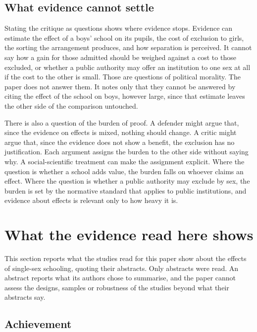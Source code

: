 \documentclass[11pt]{article}
\begin{document}
\subsection{What evidence cannot settle}

Stating the critique as questions shows where evidence stops. Evidence can estimate the effect of a boys' school on its pupils, the cost of exclusion to girls, the sorting the arrangement produces, and how separation is perceived. It cannot say how a gain for those admitted should be weighed against a cost to those excluded, or whether a public authority may offer an institution to one sex at all if the cost to the other is small. Those are questions of political morality. The paper does not answer them. It notes only that they cannot be answered by citing the effect of the school on boys, however large, since that estimate leaves the other side of the comparison untouched.

There is also a question of the burden of proof. A defender might argue that, since the evidence on effects is mixed, nothing should change. A critic might argue that, since the evidence does not show a benefit, the exclusion has no justification. Each argument assigns the burden to the other side without saying why. A social-scientific treatment can make the assignment explicit. Where the question is whether a school adds value, the burden falls on whoever claims an effect. Where the question is whether a public authority may exclude by sex, the burden is set by the normative standard that applies to public institutions, and evidence about effects is relevant only to how heavy it is.

\section{What the evidence read here shows}\label{sec:evidence}

This section reports what the studies read for this paper show about the effects of single-sex schooling, quoting their abstracts. Only abstracts were read. An abstract reports what its authors chose to summarise, and the paper cannot assess the designs, samples or robustness of the studies beyond what their abstracts say.

\subsection{Achievement}
\end{document}
